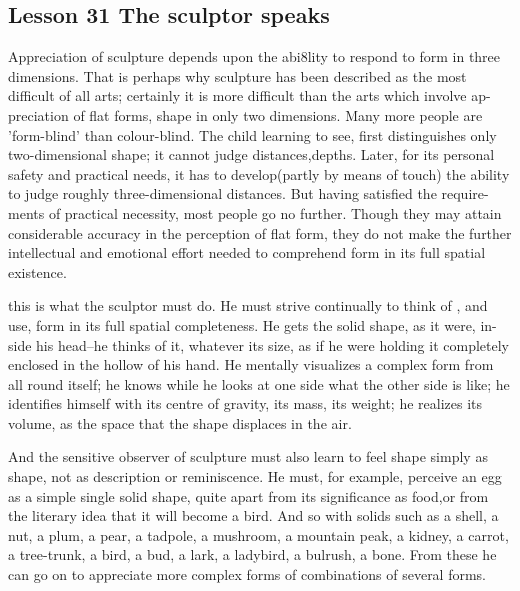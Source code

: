 \documentclass[kindlepaper]{BHCexam4kindle}
\begin{document}
\subsection{Lesson 31
The sculptor speaks}
\par
Appreciation of sculpture depends upon the abi8lity to respond to form in three
dimensions. That is perhaps why sculpture has been described as the most
difficult of all arts; certainly it is more difficult than the arts which involve ap-
preciation of flat forms, shape in only two dimensions. Many more people are
'form-blind' than colour-blind. The child learning to see, first distinguishes only
two-dimensional shape; it cannot judge distances,depths. Later, for its personal
safety and practical needs, it has to develop(partly by means of touch) the ability
to judge roughly three-dimensional distances. But having satisfied the require-
ments of practical necessity, most people go no further. Though they may attain
considerable accuracy in the perception of flat form, they do not make the further
intellectual and emotional effort needed to comprehend form in its full spatial
existence.
\par
this is what the sculptor must do. He must strive continually to think of , and
use, form in its full spatial completeness. He gets the solid shape, as it were, in-
side his head--he thinks of it, whatever its size, as if he were holding it completely
enclosed in the hollow of his hand. He mentally visualizes a complex form from
all round itself; he knows while he looks at one side what the other side is like;
he identifies himself with its centre of gravity, its mass, its weight; he realizes
its volume, as the space that the shape displaces in the air.
\par
And the sensitive observer of sculpture must also learn to feel shape simply as
shape, not as description or reminiscence. He must, for example, perceive an
egg as a simple single solid shape, quite apart from its significance as food,or
from the literary idea that it will become a bird. And so with solids such as a
shell, a nut, a plum, a pear, a tadpole, a mushroom, a mountain peak, a kidney, a
carrot, a tree-trunk, a bird, a bud, a lark, a ladybird, a bulrush, a bone. From
these he can go on to appreciate more complex forms of combinations of several
forms.
\clearpage
\end{document}
